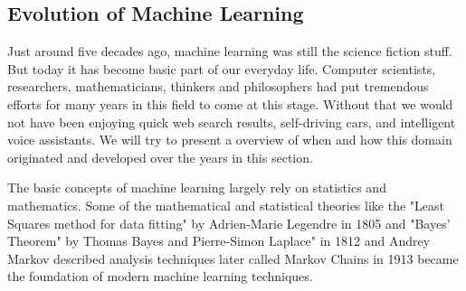 \subsection{Evolution of Machine Learning}
Just around five decades ago, machine learning was still the science fiction stuff. But today it has become basic part of our everyday life. Computer scientists, researchers, mathematicians, thinkers and philosophers had put tremendous efforts for many years in this field to come at this stage. Without that we would not have been enjoying quick web search results, self-driving cars, and intelligent voice assistants. We will try to present a overview of when and how this domain originated and developed over the years in this section.
\newline
\par
The basic concepts of machine learning largely rely on statistics and mathematics. Some of the mathematical and statistical theories like the "Least Squares method for data fitting" by Adrien-Marie Legendre in 1805 and "Bayes' Theorem" by Thomas Bayes and Pierre-Simon Laplace" in 1812 and Andrey Markov described analysis techniques later called Markov Chains in 1913 \cite{ml_history} became the foundation of modern machine learning techniques.
\newline
